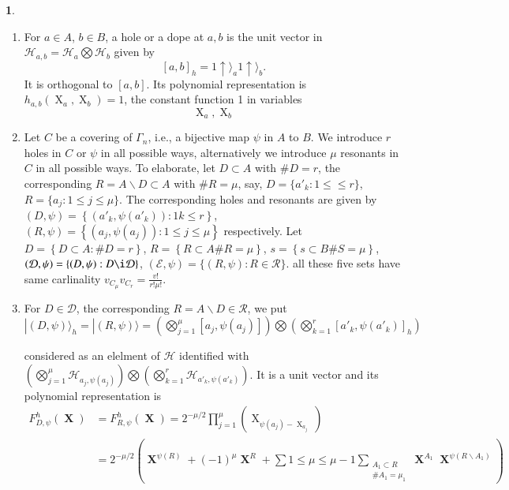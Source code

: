 \documentclass[a4paper,12pt]{article}
\DeclareMathOperator{\x}{\mathrm{X}}
\theoremstyle{definition}
\theoremstyle{underlinethm}
\theoremstyle{definition}
\newtheorem{subsubsec}{}[subsection]
\begin{document}
\begin{subsubsec}\label{subsubsection-3.2.1}
\begin{enumerate}[label=(\alph*)]
\item  For $a \in A$, $b \in B$, a hole or a dope at $a, b$ is the unit vector in $\mathcal{H}_{a,b} = \mathcal{H}_{a} \bigotimes \mathcal{H}_{b}$ given by 
$$
[a, b]_{h} = 1 \uparrow \rangle_{a} 1 \uparrow \rangle_{b}.
$$
It is orthogonal to $[a,b]$. Its polynomial representation is $h_{a,b} (\x_{a}, \x_{b})=1$, the constant function 1 in variables 
\begin{equation}
\x_{a}, \x_{b}\tag{3.73}\label{eq-3.73}
\end{equation}

\item Let $C$ be a covering of $\Gamma_{n}$, i.e., a bijective map $\psi$ in $A$ to $B$. We introduce $r$ holes in $C$ or $\psi$ in all possible ways, alternatively we introduce $\mu$ resonants in $C$ in all possible ways. To elaborate, let $D\subset A$ with $\# D = r$, the corresponding $R = A \smallsetminus D \subset A$ with $\# R = \mu$, say, $D = \{a'_{k}: 1 \leq \leq r \}$, $R = \{a_{j} : 1 \leq j \leq \mu \}$. The corresponding holes and resonants are given by $(D, \psi) = \left\{\left(a'_{k}, \psi(a'_{k})\right) : 1 k \leq r\right\}$, $(R, \psi) = \left\{\left(a_{j}, \psi(a_{j})\right) : 1 \leq j \leq \mu \right\}$ respectively. Let $D = \left\{D \subset A : \# D=r\right\}$, $R=\left\{R \subset A \# R = \mu\right\}$, $s=\left\{s\subset B \# S=\mu\right\}$, $(\mathcal{D}, \psi) = \{(D, \psi) : D \i  \mathcal{D}\}$, $(\mathcal{E},\psi) = \{(R, \psi) : R \in \mathcal{R}\}$. all these five sets have same carlinality $v_{C_{\mu}} v_{C_{r}} = \frac{v !}{r ! \mu !}$.

\item For $D \in \mathcal{D}$, the corresponding $R = A \smallsetminus D \in \mathcal{R}$, we put $| (D , \psi) \rangle_{h} = | (R, \psi) \rangle = \left(\bigotimes\limits_{j=1}^{\mu} [a_{j}, \psi (a_{j})] \right) \bigotimes \left(\bigotimes\limits_{k=1}^{r} [a'_{k}, \psi (a'_{k})]_{h}\right)$

considered as an elelment of $\mathcal{H}$ identified with $\left(\bigotimes\limits_{j=1}^{\mu} \mathcal{H}_{a_{j}, \psi(a_{j})}\right) \bigotimes \left(\bigotimes\limits_{k=1}^{r} \mathcal{H}_{a'_{k}, \psi (a'_{k})} \right)$. It is a unit vector and its polynomial representation is
\begin{align*}
F_{D, \psi}^{h} (\boldsymbol{\x}) &= F_{R, \psi}^{h}(\boldsymbol{\x}) = 2^{-\mu/2} \prod_{j=1}^{\mu} \left(\x_{\psi(a_{j}) - \x_{a_{j}}}\right)\\
 & = 2^{-\mu/2} \left(\boldsymbol{\x}^{\psi(R)} + (-1)^{\mu} \boldsymbol{\x}^{R} + \sum{1 \leq \mu \leq \mu-1} \sum_{\substack{A_{1} \subset R \\ \#A_{1} = \mu_{1}}}\boldsymbol{\x}^{A_{1}} \boldsymbol{\x}^{\psi(R \smallsetminus A_{1})}\right)\tag{3.74}\label{eq-3.74}
\end{align*} 


\end{enumerate}
\end{subsubsec}
\end{document}
